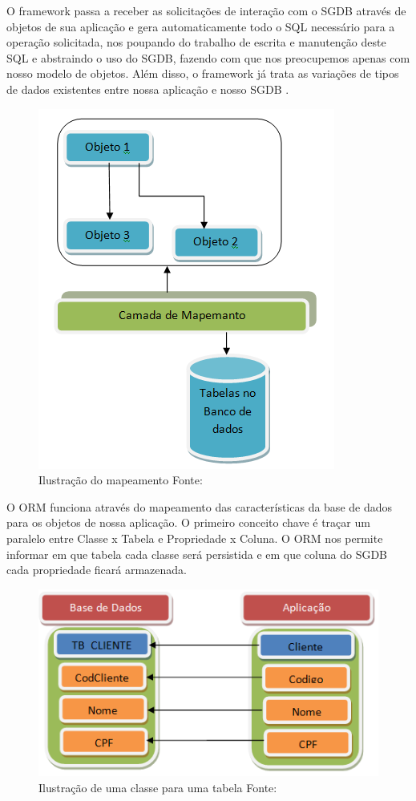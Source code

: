 O framework passa a receber as solicitações de interação com o SGDB através de objetos de sua aplicação e gera automaticamente todo o SQL necessário para a operação solicitada, nos poupando do trabalho de escrita e manutenção deste SQL e abstraindo o uso do SGDB, fazendo com que nos preocupemos apenas com nosso modelo de objetos. Além disso, o framework já trata as variações de tipos de dados existentes entre nossa aplicação e nosso SGDB \cite{orm202netmagazine}.

\begin{figure}[H]
	\centering
	\includegraphics[scale=0.5]{imagens/orm.png}
	\caption{
		Ilustração do mapeamento
		Fonte: \cite{orm202netmagazine}
	}
	\label{fig: }
\end{figure}

O ORM funciona através do mapeamento das características da base de dados para os objetos de nossa aplicação. O primeiro conceito chave é traçar um paralelo entre Classe x Tabela e Propriedade x Coluna. O ORM nos permite informar em que tabela cada classe será persistida e em que coluna do SGDB cada propriedade ficará armazenada.

\begin{figure}[H]
	\centering
	\includegraphics[scale=0.6]{imagens/mapeamentoorm.png}
	\caption{
		 Ilustração de uma classe para uma tabela
		Fonte: \cite{orm202netmagazine}
	}
	\label{fig:mapeamentoorm}
\end{figure}


